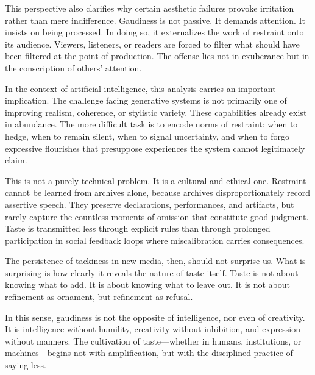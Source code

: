 \documentclass[12pt]{article}
\begin{document}
This perspective also clarifies why certain aesthetic failures provoke irritation rather than mere indifference. Gaudiness is not passive. It demands attention. It insists on being processed. In doing so, it externalizes the work of restraint onto its audience. Viewers, listeners, or readers are forced to filter what should have been filtered at the point of production. The offense lies not in exuberance but in the conscription of others’ attention.

In the context of artificial intelligence, this analysis carries an important implication. The challenge facing generative systems is not primarily one of improving realism, coherence, or stylistic variety. These capabilities already exist in abundance. The more difficult task is to encode norms of restraint: when to hedge, when to remain silent, when to signal uncertainty, and when to forgo expressive flourishes that presuppose experiences the system cannot legitimately claim.

This is not a purely technical problem. It is a cultural and ethical one. Restraint cannot be learned from archives alone, because archives disproportionately record assertive speech. They preserve declarations, performances, and artifacts, but rarely capture the countless moments of omission that constitute good judgment. Taste is transmitted less through explicit rules than through prolonged participation in social feedback loops where miscalibration carries consequences.

The persistence of tackiness in new media, then, should not surprise us. What is surprising is how clearly it reveals the nature of taste itself. Taste is not about knowing what to add. It is about knowing what to leave out. It is not about refinement as ornament, but refinement as refusal.

In this sense, gaudiness is not the opposite of intelligence, nor even of creativity. It is intelligence without humility, creativity without inhibition, and expression without manners. The cultivation of taste—whether in humans, institutions, or machines—begins not with amplification, but with the disciplined practice of saying less.
\end{document}
